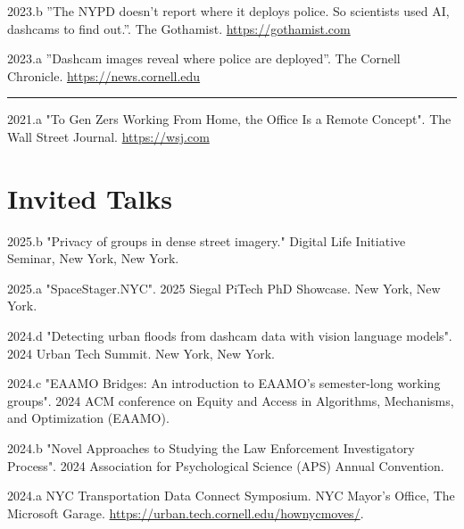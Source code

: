 \documentclass[10pt,letterpaper]{report}
\begin{document}
\begin{tablist}
            \item[2023.b] \tab{}”The NYPD doesn’t report where it deploys police. So scientists used AI, dashcams to find out.”. The Gothamist. \href{https://gothamist.com/news/nypd-does-not-report-where-it-deploys-police-scientists-used-ai-dashcams-to-find-out}{https://gothamist.com}

            \item[2023.a] \tab{} ”Dashcam images reveal where police are deployed”. The Cornell Chronicle. \href{https://news.cornell.edu/stories/2023/07/dashcam-images-reveal-where-police-are-deployed}{https://news.cornell.edu}

            \item[\rule{2em}{0.4pt}]

            \item[2021.a] \tab{} "To Gen Zers Working From Home, the Office Is a Remote Concept". The Wall Street Journal. \href{https://www.wsj.com/articles/to-gen-zers-working-from-home-the-office-is-a-remote-concept-11629538204}{https://wsj.com}
            
        \end{tablist}
        
    \section*{Invited Talks}

    \begin{tablist}

        \item[2025.b] \tab{} "Privacy of groups in dense street imagery." Digital Life Initiative Seminar, New York, New York. 

        \item[2025.a] \tab{} "SpaceStager.NYC". 2025 Siegal PiTech PhD Showcase. New York, New York. 

        \item[2024.d] \tab{} "Detecting urban floods from dashcam data with vision language models". 2024 Urban Tech Summit. New York, New York. 

        \item[2024.c] \tab{} "EAAMO Bridges: An introduction to EAAMO’s semester-long working groups". 2024 ACM conference on Equity and Access in Algorithms, Mechanisms, and Optimization (EAAMO).

        \item[2024.b] \tab{} "Novel Approaches to Studying the Law Enforcement Investigatory Process". 2024 Association for Psychological Science (APS) Annual Convention. 

        \item[2024.a] \tab{} NYC Transportation Data Connect Symposium. NYC Mayor's Office, The Microsoft Garage. \href{https://urban.tech.cornell.edu/hownycmoves/}{https://urban.tech.cornell.edu/hownycmoves/}. 

    \end{tablist}
    \clearpage
\end{document}
